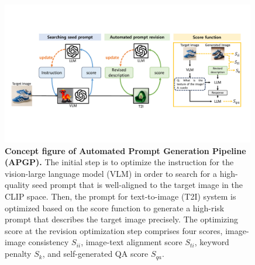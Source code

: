 
\begin{figure}
    \centering
    \includegraphics[width=0.99\textwidth]{figure_folder/concept.pdf}
    \vspace{-0.1in}
    \caption{\small \textbf{Concept figure of Automated Prompt Generation Pipeline (APGP).} The initial step is to optimize the instruction for the vision-large language model (VLM) in order to search for a high-quality seed prompt that is well-aligned to the target image in the CLIP space. Then, the prompt for text-to-image (T2I) system is optimized based on the score function to generate a high-risk prompt that describes the target image precisely. The optimizing score at the revision optimization step comprises four scores, image-image consistency $S_{ii}$, image-text alignment score $S_{ti}$, keyword penalty $S_k$, and self-generated QA score $S_{qa}$.}
    \label{fig:pipeline}
    \vspace{-0.23in}
\end{figure}